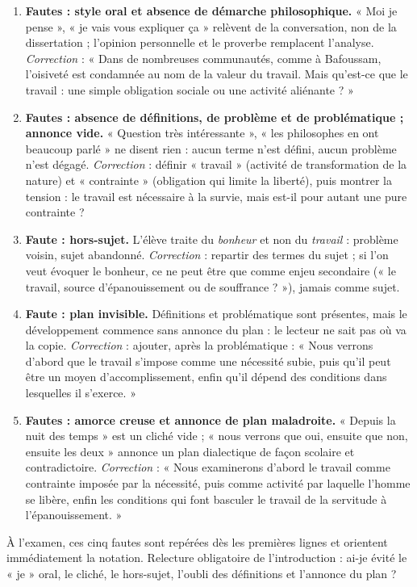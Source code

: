 \documentclass[11pt]{article}
\begin{document}
\begin{corrige}
\begin{enumerate}
\item \textbf{Fautes : style oral et absence de démarche philosophique.} « Moi je pense », « je vais vous expliquer ça » relèvent de la conversation, non de la dissertation ; l'opinion personnelle et le proverbe remplacent l'analyse. \emph{Correction} : « Dans de nombreuses communautés, comme à Bafoussam, l'oisiveté est condamnée au nom de la valeur du travail. Mais qu'est-ce que le travail : une simple obligation sociale ou une activité aliénante ? »
\item \textbf{Fautes : absence de définitions, de problème et de problématique ; annonce vide.} « Question très intéressante », « les philosophes en ont beaucoup parlé » ne disent rien : aucun terme n'est défini, aucun problème n'est dégagé. \emph{Correction} : définir « travail » (activité de transformation de la nature) et « contrainte » (obligation qui limite la liberté), puis montrer la tension : le travail est nécessaire à la survie, mais est-il pour autant une pure contrainte ?
\item \textbf{Faute : hors-sujet.} L'élève traite du \emph{bonheur} et non du \emph{travail} : problème voisin, sujet abandonné. \emph{Correction} : repartir des termes du sujet ; si l'on veut évoquer le bonheur, ce ne peut être que comme enjeu secondaire (« le travail, source d'épanouissement ou de souffrance ? »), jamais comme sujet.
\item \textbf{Faute : plan invisible.} Définitions et problématique sont présentes, mais le développement commence sans annonce du plan : le lecteur ne sait pas où va la copie. \emph{Correction} : ajouter, après la problématique : « Nous verrons d'abord que le travail s'impose comme une nécessité subie, puis qu'il peut être un moyen d'accomplissement, enfin qu'il dépend des conditions dans lesquelles il s'exerce. »
\item \textbf{Fautes : amorce creuse et annonce de plan maladroite.} « Depuis la nuit des temps » est un cliché vide ; « nous verrons que oui, ensuite que non, ensuite les deux » annonce un plan dialectique de façon scolaire et contradictoire. \emph{Correction} : « Nous examinerons d'abord le travail comme contrainte imposée par la nécessité, puis comme activité par laquelle l'homme se libère, enfin les conditions qui font basculer le travail de la servitude à l'épanouissement. »
\end{enumerate}
\begin{attention}
À l'examen, ces cinq fautes sont repérées dès les premières lignes et orientent immédiatement la notation. Relecture obligatoire de l'introduction : ai-je évité le « je » oral, le cliché, le hors-sujet, l'oubli des définitions et l'annonce du plan ?
\end{attention}
\end{corrige}
\end{document}
